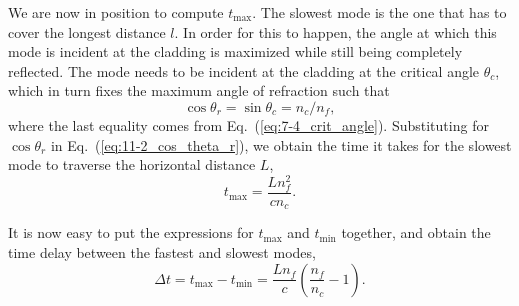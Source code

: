 We are now in position to compute $t_{\max}$.
The slowest mode is the one that has to cover the longest distance $l$.
In order for this to happen, the angle at which this mode is incident at the cladding is maximized while still being completely reflected.
The mode needs to be incident at the cladding at the critical angle $\theta_c$, which in turn fixes the maximum angle of refraction such that
\begin{equation}
    \cos\theta_r = \sin\theta_c = n_c / n_f,
    \label{eq:11-2_cos_theta_r}
\end{equation}
where the last equality comes from Eq.~(\ref{eq:7-4_crit_angle}).
Substituting for $\cos\theta_r$ in Eq.~(\ref{eq:11-2_cos_theta_r}), we obtain the time it takes for the slowest mode to traverse the horizontal distance $L$,
\begin{equation}
    t_{\max }=\frac{L n_f^2}{c n_c}.
    \label{eq:propagation_t_max}
\end{equation}

It is now easy to put the expressions for $t_{\mathrm{max}}$ and $t_{\mathrm{min}}$ together, and obtain the time delay between the fastest and slowest modes, 
\begin{equation}
    \Delta t = t_{\max} - t_{\min} = \frac{L n_f}{c}\left(\frac{n_f}{n_c}-1\right).
    \label{eq:11-2_time_delay}
\end{equation}

